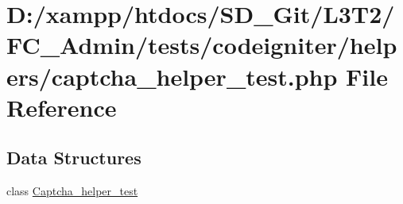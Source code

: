 \hypertarget{captcha__helper__test_8php}{}\section{D\+:/xampp/htdocs/\+S\+D\+\_\+\+Git/\+L3\+T2/\+F\+C\+\_\+\+Admin/tests/codeigniter/helpers/captcha\+\_\+helper\+\_\+test.php File Reference}
\label{captcha__helper__test_8php}
\subsection*{Data Structures}
\begin{DoxyCompactItemize}
\item 
class \hyperlink{class_captcha__helper__test}{Captcha\+\_\+helper\+\_\+test}
\end{DoxyCompactItemize}
